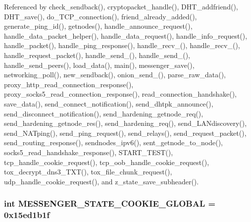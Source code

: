 Referenced by check\+\_\+sendback(), cryptopacket\+\_\+handle(), D\+H\+T\+\_\+addfriend(), D\+H\+T\+\_\+save(), do\+\_\+\+T\+C\+P\+\_\+connection(), friend\+\_\+already\+\_\+added(), generate\+\_\+ping\+\_\+id(), getnodes(), handle\+\_\+announce\+\_\+request(), handle\+\_\+data\+\_\+packet\+\_\+helper(), handle\+\_\+data\+\_\+request(), handle\+\_\+info\+\_\+request(), handle\+\_\+packet(), handle\+\_\+ping\+\_\+response(), handle\+\_\+recv\+\_(), handle\+\_\+recv\+\_(), handle\+\_\+request\+\_\+packet(), handle\+\_\+send\+\_(), handle\+\_\+send\+\_(), handle\+\_\+send\+\_\+peers(), load\+\_\+data(), main(), messenger\+\_\+save(), networking\+\_\+poll(), new\+\_\+sendback(), onion\+\_\+send\+\_(), parse\+\_\+raw\+\_\+data(), proxy\+\_\+http\+\_\+read\+\_\+connection\+\_\+response(), proxy\+\_\+socks5\+\_\+read\+\_\+connection\+\_\+response(), read\+\_\+connection\+\_\+handshake(), save\+\_\+data(), send\+\_\+connect\+\_\+notification(), send\+\_\+dhtpk\+\_\+announce(), send\+\_\+disconnect\+\_\+notification(), send\+\_\+hardening\+\_\+getnode\+\_\+req(), send\+\_\+hardening\+\_\+getnode\+\_\+res(), send\+\_\+hardening\+\_\+req(), send\+\_\+\+L\+A\+Ndiscovery(), send\+\_\+\+N\+A\+Tping(), send\+\_\+ping\+\_\+request(), send\+\_\+relays(), send\+\_\+request\+\_\+packet(), send\+\_\+routing\+\_\+response(), sendnodes\+\_\+ipv6(), sent\+\_\+getnode\+\_\+to\+\_\+node(), socks5\+\_\+read\+\_\+handshake\+\_\+response(), S\+T\+A\+R\+T\+\_\+\+T\+E\+S\+T(), tcp\+\_\+handle\+\_\+cookie\+\_\+request(), tcp\+\_\+oob\+\_\+handle\+\_\+cookie\+\_\+request(), tox\+\_\+decrypt\+\_\+dns3\+\_\+\+T\+X\+T(), tox\+\_\+file\+\_\+chunk\+\_\+request(), udp\+\_\+handle\+\_\+cookie\+\_\+request(), and z\+\_\+state\+\_\+save\+\_\+subheader().

\hypertarget{namespacemake-funny-savefile_ac50b778e4b71ad561339c51308682079}{
\subsubsection[{M\+E\+S\+S\+E\+N\+G\+E\+R\+\_\+\+S\+T\+A\+T\+E\+\_\+\+C\+O\+O\+K\+I\+E\+\_\+\+G\+L\+O\+B\+A\+L}]{\setlength{\rightskip}{0pt plus 5cm}int M\+E\+S\+S\+E\+N\+G\+E\+R\+\_\+\+S\+T\+A\+T\+E\+\_\+\+C\+O\+O\+K\+I\+E\+\_\+\+G\+L\+O\+B\+A\+L = 0x15ed1b1f}}\label{namespacemake-funny-savefile_ac50b778e4b71ad561339c51308682079}


